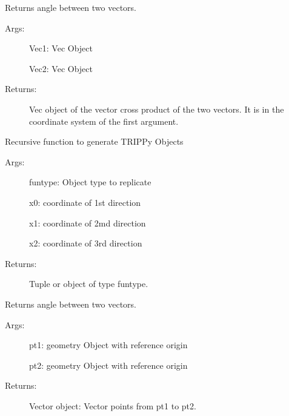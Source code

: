 \documentclass[letterpaper,10pt,english]{sphinxmanual}
\begin{document}

\begin{fulllineitems}
\label{TRIPPy:TRIPPy.geometry.cross}
Returns angle between two vectors.
\begin{description}
\item[{Args:}] \leavevmode
Vec1: Vec Object

Vec2: Vec Object

\item[{Returns:}] \leavevmode
Vec object of the vector cross product of the two vectors.
It is in the coordinate system of the first argument.

\end{description}

\end{fulllineitems}


\begin{fulllineitems}
\label{TRIPPy:TRIPPy.geometry.fill}
Recursive function to generate TRIPPy Objects
\begin{description}
\item[{Args:}] \leavevmode
funtype: Object type to replicate

x0: coordinate of 1st direction

x1: coordinate of 2md direction

x2: coordinate of 3rd direction

\item[{Returns:}] \leavevmode
Tuple or object of type funtype.

\end{description}

\end{fulllineitems}


\begin{fulllineitems}
\label{TRIPPy:TRIPPy.geometry.pts2Vec}
Returns angle between two vectors.
\begin{description}
\item[{Args:}] \leavevmode
pt1: geometry Object with reference origin

pt2: geometry Object with reference origin

\item[{Returns:}] \leavevmode
Vector object: Vector points from pt1 to pt2.

\end{description}

\end{fulllineitems}
\end{document}
